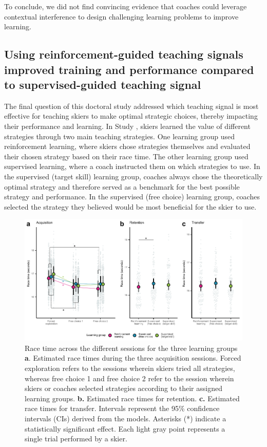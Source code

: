 To conclude, we did not find convincing evidence that coaches could leverage contextual interference to design challenging learning problems to improve learning.

\subsection{Using reinforcement-guided teaching signals improved training and performance compared to supervised-guided teaching signal}
The final question of this doctoral study addressed which teaching signal is most effective for teaching skiers to make optimal strategic choices, thereby impacting their performance and learning. In Study , skiers learned the value of different strategies through two main teaching strategies. One learning group used reinforcement learning, where skiers chose strategies themselves and evaluated their chosen strategy based on their race time. The other learning group used supervised learning, where a coach instructed them on which strategies to use. In the supervised (target skill) learning group, coaches always chose the theoretically optimal strategy and therefore served as a benchmark for the best possible strategy and performance. In the supervised (free choice) learning group, coaches selected the strategy they believed would be most beneficial for the skier to use.
\begin{figure}
    \centering
    \includegraphics[width=1\linewidth]{figure/figure_racingtimes_2.pdf}
    \caption{Race time across the different sessions for the three learning groups \textbf{a}. Estimated race times during the three acquisition sessions. Forced exploration refers to the sessions wherein skiers tried all strategies, whereas free choice 1 and free choice 2 refer to the session wherein skiers or coaches selected strategies according to their assigned learning groups. \textbf{b.} Estimated race times for retention. \textbf{c.} Estimated race times for transfer. Intervals represent the 95\% confidence intervals (CIs) derived from the models. Asterisks (*) indicate a statistically significant effect. Each light gray point represents a single trial performed by a skier.}
    \label{fig:rlstudy_racetime}
\end{figure}

